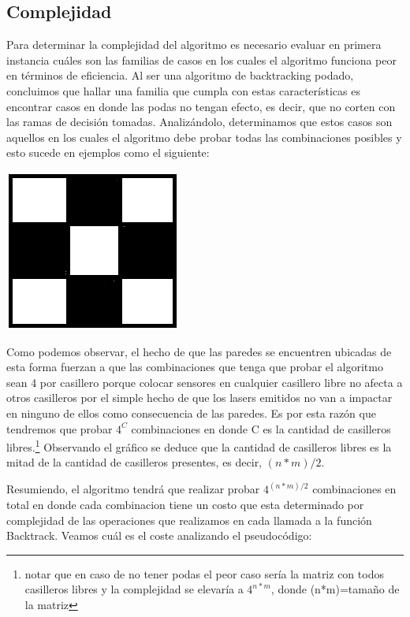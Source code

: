 \subsection{Complejidad}
Para determinar la complejidad del algoritmo es necesario evaluar en primera instancia cuáles son las familias de casos en los cuales el algoritmo funciona peor en términos de eficiencia. Al ser una algoritmo de backtracking podado, concluimos que hallar una familia que cumpla con estas características es encontrar casos en donde las podas no tengan efecto, es decir, que no corten con las ramas de decisión tomadas. Analizándolo, determinamos que estos casos son aquellos en los cuales el algoritmo debe probar todas las combinaciones posibles y esto sucede en ejemplos como el siguiente:

\includegraphics[scale=0.5]{ej3/imgs/ajedrezDibujo.png}

Como podemos observar, el hecho de que las paredes se encuentren ubicadas de esta forma fuerzan a que las combinaciones que tenga que probar el algoritmo sean 4 por casillero porque colocar sensores en cualquier casillero libre no afecta a otros casilleros por el simple hecho de que los lasers emitidos no van a impactar en ninguno de ellos como consecuencia de las paredes. Es por esta razón que tendremos que probar $4^C$ combinaciones en donde C es la cantidad de casilleros libres.\footnote{notar que en caso de no tener podas el peor caso sería la matriz con todos casilleros libres y la complejidad se elevaría a $4^{n*m}$, donde (n*m)=tamaño de la matriz} Observando el gráfico se deduce que la cantidad de casilleros libres es la mitad de la cantidad de casilleros presentes, es decir, $(n*m)/2$.

Resumiendo, el algoritmo tendrá que realizar probar $4^{(n*m)/2}$ combinaciones en total en donde cada combinacion tiene un costo que esta determinado por complejidad de las operaciones que realizamos en cada llamada a la función Backtrack. Veamos cuál es el coste analizando el pseudocódigo:

